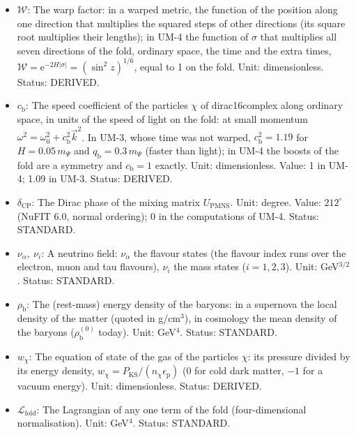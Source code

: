 \documentclass[
  10pt,
]{article}
\begin{document}
\begin{itemize}
  fold (in \(\mathcal{T}^r{}_r = \mathcal{L}_{\mathrm{fold}}\)). Unit:
  GeV\(^4\). Status: STANDARD.
\item
  \(\mathcal{W}\): The warp factor: in a warped metric, the function of
  the position along one direction that multiplies the squared steps of
  other directions (its square root multiplies their lengths); in UM-4
  the function of \(\sigma\) that multiplies all seven directions of the
  fold, ordinary space, the time and the extra times,
  \(\mathcal{W} = \mathrm{e}^{-2H\lvert\sigma\rvert} = (\sin^2z)^{1/6}\),
  equal to 1 on the fold. Unit: dimensionless. Status: DERIVED.
\item
  \(c_{\mathrm{b}}\): The speed coefficient of the particles \(\chi\) of
  dirac16complex along ordinary space, in units of the speed of light on
  the fold: at small momentum
  \(\omega^2 = \omega_0^2 + c_{\mathrm{b}}^2\vec k^2\). In UM-3, whose
  time was not warped, \(c_{\mathrm{b}}^2 = 1.19\) for
  \(H = 0.05\,m_\Psi\) and \(q_{\mathrm{b}} = 0.3\,m_\Psi\) (faster than
  light); in UM-4 the boosts of the fold are a symmetry and
  \(c_{\mathrm{b}} = 1\) exactly. Unit: dimensionless. Value: 1 in UM-4;
  1.09 in UM-3. Status: DERIVED.
\item
  \(\delta_{\mathrm{CP}}\): The Dirac phase of the mixing matrix
  \(U_{\mathrm{PMNS}}\). Unit: degree. Value: \(212^\circ\) (NuFIT 6.0,
  normal ordering); 0 in the computations of UM-4. Status: STANDARD.
\item
  \(\nu_\alpha,\ \nu_i\): A neutrino field: \(\nu_\alpha\) the flavour
  states (the flavour index runs over the electron, muon and tau
  flavours), \(\nu_i\) the mass states (\(i = 1, 2, 3\)). Unit:
  GeV\(^{3/2}\). Status: STANDARD.
\item
  \(\rho_{\mathrm{b}}\): The (rest-mass) energy density of the baryons:
  in a supernova the local density of the matter (quoted in g/cm\(^3\)),
  in cosmology the mean density of the baryons
  (\(\rho_{\mathrm{b}}^{(0)}\) today). Unit: GeV\(^4\). Status:
  STANDARD.
\item
  \(w_\chi\): The equation of state of the gas of the particles
  \(\chi\): its pressure divided by its energy density,
  \(w_\chi = P_{\mathrm{KS}}/(n_\chi\epsilon_{\mathrm{p}})\) (0 for cold
  dark matter, \(-1\) for a vacuum energy). Unit: dimensionless. Status:
  DERIVED.
\item
  \(\mathcal{L}_{\mathrm{fold}}\): The Lagrangian of any one term of the
  fold (four-dimensional normalisation). Unit: GeV\(^4\). Status:
  STANDARD.
\end{itemize}
\end{document}
